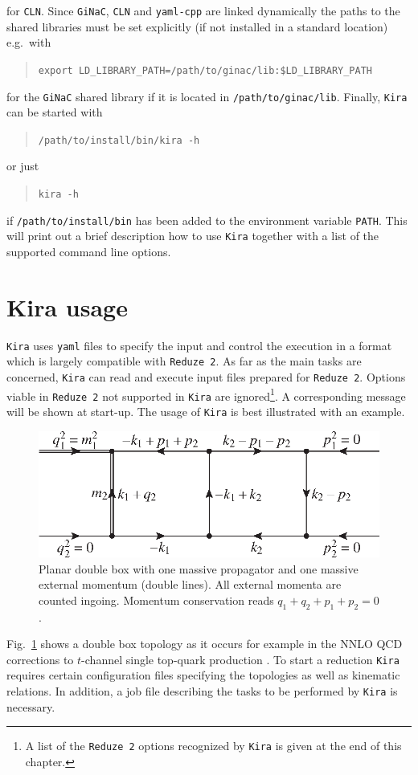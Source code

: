 \documentclass[a4paper,12pt]{scrartcl}
\newcommand*{\kira}{\texttt{Kira}}
\newcommand*{\ginac}{\texttt{GiNaC}}
\newcommand*{\cln}{\texttt{CLN}}
\newcommand*{\yaml}{\texttt{yaml}}
\newcommand*{\yamlcpp}{\texttt{yaml-cpp}}
\newcommand*{\reduzetwo}{\texttt{Reduze\,2}}
\begin{document}
for \cln{}. Since \ginac{}, \cln{} and \yamlcpp{} are linked dynamically the
paths to the
shared libraries must be set explicitly (if not installed in a standard
location) e.g.\ with
\begin{verse}
  \texttt{export LD\_LIBRARY\_PATH=/path/to/ginac/lib:\$LD\_LIBRARY\_PATH}
\end{verse}
for the \ginac{} shared library if it is located in \texttt{/path/to/ginac/lib}.
Finally, \kira{} can be started with
\begin{verse}
  \texttt{/path/to/install/bin/kira -h}
\end{verse}
or just
\begin{verse}
  \texttt{kira -h}
\end{verse}
if \texttt{/path/to/install/bin} has been added to the environment variable
\texttt{PATH}. This will print out a brief description how to use \kira{}
together with a list of the supported command line options.


\section{Kira usage}
\label{using Kira}

\kira{} uses \yaml{} files to specify the input and control the
execution in a format which is largely compatible with
\reduzetwo{}.  As far as the main tasks are concerned,
\kira{} can read and execute input files prepared for
\reduzetwo{}. Options viable in \reduzetwo{} not supported in
\kira{} are ignored\footnote{A list of the \reduzetwo{} options
recognized by \kira{} is given at the end of this chapter.}.
A corresponding message will be shown at
start-up.  The usage of \kira{} is best illustrated with an example.
\begin{figure}[htpb]
\setlength{\abovecaptionskip}{-10pt plus 0pt minus 0pt}
  \begin{center}
    \includegraphics{./topo7}
  \end{center}
  \caption{Planar double box with one massive propagator
    and one massive external momentum (double lines). All external
    momenta  are counted ingoing.
    Momentum conservation reads $q_{1}+q_{2}+p_{1}+p_{2}=0$.}
  \label{fig:diagram topo7m}
\end{figure}
Fig.~\ref{fig:diagram topo7m} shows a double box topology as it occurs
for example in the NNLO QCD corrections to $t$-channel single
top-quark production \cite{Assadsolimani:2014oga,Brucherseifer:2014ama}.
To start a reduction \kira{} requires certain
configuration files specifying the topologies as well as kinematic
relations. In addition, a job file describing the tasks to be performed
by \kira{} is necessary.
\end{document}
